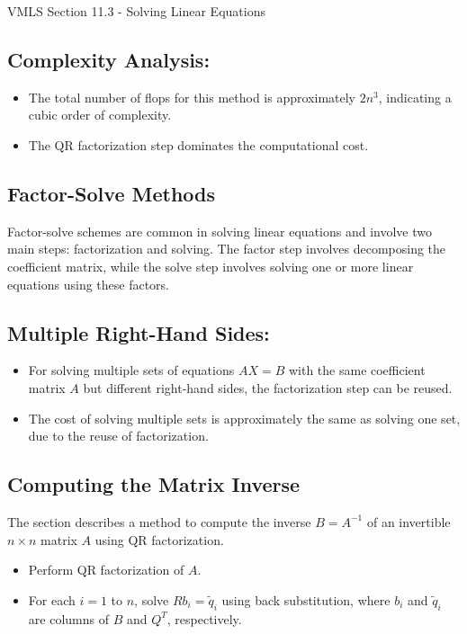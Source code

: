 \begin{notes}{VMLS Section 11.3 - Solving Linear Equations}
    \subsection*{Complexity Analysis:}
    \begin{itemize}
        \item The total number of flops for this method is approximately $2n^3$, indicating a cubic order of complexity.
        \item The QR factorization step dominates the computational cost.
    \end{itemize}

    \subsection*{Factor-Solve Methods}
    Factor-solve schemes are common in solving linear equations and involve two main steps: factorization and solving. The factor step involves decomposing the coefficient matrix, while the solve step 
    involves solving one or more linear equations using these factors. 

    \subsection*{Multiple Right-Hand Sides:}
    \begin{itemize}
        \item For solving multiple sets of equations $AX = B$ with the same coefficient matrix $A$ but different right-hand sides, the factorization step can be reused.
        \item The cost of solving multiple sets is approximately the same as solving one set, due to the reuse of factorization.
    \end{itemize}

    \subsection*{Computing the Matrix Inverse}
    The section describes a method to compute the inverse $B = A^{-1}$ of an invertible $n \times n$ matrix $A$ using QR factorization.

    \begin{Highlight}
        \begin{itemize}
            \item Perform QR factorization of $A$.
            \item For each $i = 1$ to $n$, solve $Rb_i = \tilde{q}_i$ using back substitution, where $b_i$ and $\tilde{q}_i$ are columns of $B$ and $Q^T$, respectively.
        \end{itemize}
    \end{Highlight}


\end{notes}
